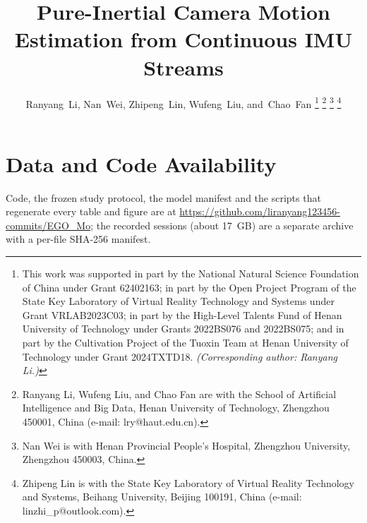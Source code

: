 \documentclass[journal]{IEEEtran}
\begin{document}
\title{Pure-Inertial Camera Motion Estimation from Continuous IMU Streams}

\author{Ranyang~Li,
        Nan~Wei,
        Zhipeng~Lin,
        Wufeng~Liu,
        and~Chao~Fan
\thanks{This work was supported in part by the National Natural Science
Foundation of China under Grant 62402163;  in part by the Open
Project Program of the State Key Laboratory of Virtual Reality Technology and
Systems under Grant VRLAB2023C03; in part by the High-Level Talents Fund of
Henan University of Technology under Grants 2022BS076 and 2022BS075; and in
part by the Cultivation Project of the Tuoxin Team at Henan University of
Technology under Grant 2024TXTD18. \emph{(Corresponding author: Ranyang Li.)}}
\thanks{Ranyang Li, Wufeng Liu, and Chao Fan are with the School of
Artificial Intelligence and Big Data, Henan University of Technology,
Zhengzhou 450001, China (e-mail: lry@haut.edu.cn).}
\thanks{Nan Wei is with Henan Provincial People's Hospital, Zhengzhou
University, Zhengzhou 450003, China.}
\thanks{Zhipeng Lin is with the State Key Laboratory of Virtual Reality
Technology and Systems, Beihang University, Beijing 100191, China (e-mail:
linzhi\_p@outlook.com).}
}


\maketitle















\section*{Data and Code Availability}
Code, the frozen study protocol, the model manifest and the scripts that
regenerate every table and figure are at
\url{https://github.com/liranyang123456-commits/EGO_Mo}; the recorded sessions
(about 17~GB) are a separate archive with a per-file SHA-256 manifest.




\end{document}
